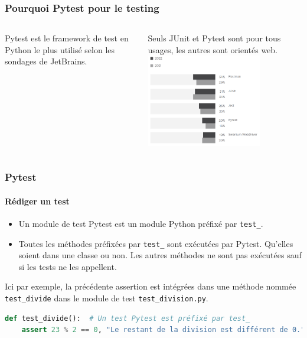 \documentclass{beamer}
\begin{document}
    \begin{frame}
        \frametitle{Pourquoi Pytest pour le testing}
        \transdissolve
        \begin{columns}
            Pytest est le framework de test en Python le plus utilisé selon les sondages de JetBrains\footnotemark.

            Seuls JUnit et Pytest sont pour tous usages, les autres sont orientés web.
            \centering
            \includegraphics[width=5cm]{image/jetbrains-survey-testing-framework.png}
        \end{columns}

    \end{frame}

    \begin{frame}[fragile]
        \frametitle{Pytest}
        \framesubtitle{Rédiger un test}
        \transdissolve
        \begin{itemize}
            \item Un module de test Pytest est un module Python préfixé par \lstinline{test_}.

            \item Toutes les méthodes préfixées par \lstinline{test_} sont exécutées par Pytest. Qu'elles soient
            dans une classe ou non. Les autres méthodes ne sont pas exécutées sauf si les tests ne les appellent.
        \end{itemize}
        Ici par exemple, la précédente assertion est intégrées dans une méthode nommée \lstinline{test_divide} dans le module de test \lstinline{test_division.py}.
        \begin{lstlisting}[language=Python]
def test_divide():  # Un test Pytest est préfixé par test_
    assert 23 % 2 == 0, "Le restant de la division est différent de 0."
        \end{lstlisting}
    \end{frame}
\end{document}
